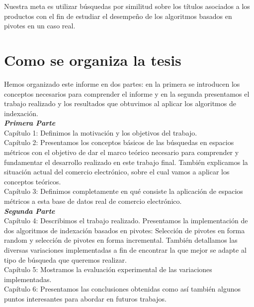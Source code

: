 Nuestra meta es utilizar b\'usquedas por similitud sobre los t\'itulos asociados a los productos con el fin de estudiar el desempeño de los algoritmos basados en pivotes en un caso real. 

\section{Como se organiza la tesis}

Hemos organizado este informe en dos partes: en la primera se introducen los conceptos necesarios para comprender el informe y en la segunda presentamos el trabajo realizado y los resultados que obtuvimos al aplicar los algoritmos de indexaci\'on.\\

\noindent \textbf{\textit{Primera Parte}}\\

\noindent Cap\'itulo 1: Definimos la motivaci\'on y los objetivos del trabajo.\\

\noindent Cap\'itulo 2: Presentamos los conceptos b\'asicos de las b\'usquedas en espacios m\'etricos con el objetivo de dar el marco te\'orico necesario para comprender y fundamentar el desarrollo realizado en este trabajo final. Tambi\'en explicamos la situaci\'on actual del comercio electr\'onico, sobre el cual vamos a aplicar los conceptos te\'oricos.\\

\noindent Cap\'itulo 3: Definimos completamente en qu\'e consiste la aplicaci\'on de espacios m\'etricos a esta base de datos real de comercio electr\'onico.\\

\noindent \textbf{\textit{Segunda Parte}}\\

\noindent Cap\'itulo 4: Describimos el trabajo realizado. Presentamos la implementaci\'on de dos algoritmos de indexaci\'on basados en pivotes: Selecci\'on de pivotes en forma random y selecci\'on de pivotes en forma incremental. Tambi\'en detallamos las diversas variaciones implementadas a fin de encontrar la que mejor se adapte al tipo de b\'usqueda que queremos realizar.\\

\noindent Cap\'itulo 5: Mostramos la evaluaci\'on experimental de las variaciones implementadas.\\

\noindent Cap\'itulo 6: Presentamos las conclusiones obtenidas como as\'i tambi\'en algunos puntos interesantes para abordar en futuros trabajos.\\

